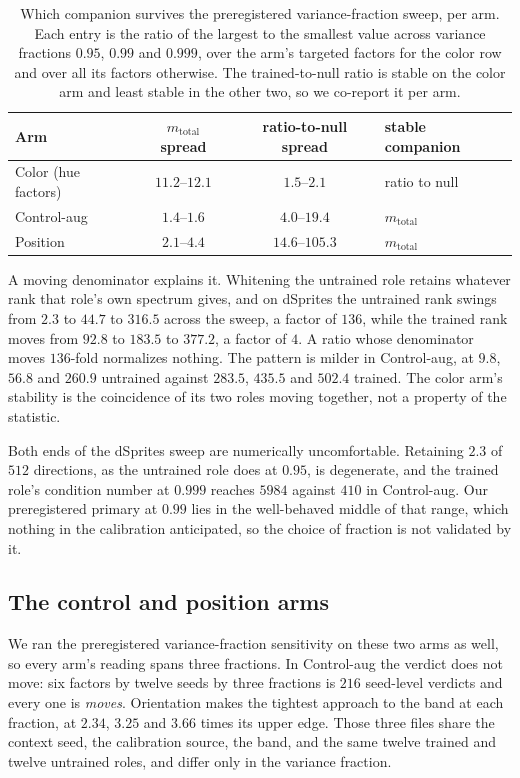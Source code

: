 \documentclass[10pt]{article}
\begin{document}
\begin{table}[tb]
\centering
\caption{Which companion survives the preregistered variance-fraction sweep, per arm. Each entry is
the ratio of the largest to the smallest value across variance fractions $0.95$, $0.99$ and $0.999$,
over the arm's targeted factors for the color row and over all its factors otherwise. The
trained-to-null ratio is stable on the color arm and least stable in the other two, so we
co-report it per arm.}
\label{tab:sweepstab}
\small
\begin{tabular}{l cc l}
\toprule
Arm & $m_{\mathrm{total}}$ spread & ratio-to-null spread & stable companion \\
\midrule
Color (hue factors) & $11.2$--$12.1$ & $1.5$--$2.1$ & ratio to null \\
Control-aug          & $1.4$--$1.6$   & $4.0$--$19.4$ & $m_{\mathrm{total}}$ \\
Position             & $2.1$--$4.4$   & $14.6$--$105.3$ & $m_{\mathrm{total}}$ \\
\bottomrule
\end{tabular}
\end{table}

A moving denominator explains it. Whitening the untrained role retains whatever rank that role's own
spectrum gives, and on dSprites the untrained rank swings
from $2.3$ to $44.7$ to $316.5$ across the sweep, a factor of $136$, while the trained rank moves
from $92.8$ to $183.5$ to $377.2$, a factor of $4$. A ratio whose denominator moves $136$-fold
normalizes nothing. The pattern is milder in Control-aug, at $9.8$, $56.8$ and $260.9$
untrained against $283.5$, $435.5$ and $502.4$ trained. The color arm's stability is the coincidence
of its two roles moving together, not a property of the statistic.

Both ends of the dSprites sweep are numerically uncomfortable. Retaining $2.3$ of
$512$ directions, as the untrained role does at $0.95$, is degenerate, and the trained role's
condition number at $0.999$ reaches $5984$ against $410$ in Control-aug. Our preregistered
primary at $0.99$ lies in the well-behaved middle of that range, which nothing in the calibration
anticipated, so the choice of fraction is not validated by it.

\subsection*{The control and position arms}
We ran the preregistered variance-fraction sensitivity on these two arms as well, so every arm's
reading spans three fractions. In Control-aug the verdict does not move:
six factors by twelve seeds by three fractions is $216$ seed-level verdicts and every one is
\emph{moves}. Orientation makes the tightest approach to the band at each fraction, at $2.34$,
$3.25$ and $3.66$ times its upper edge. Those three files share
the context seed, the calibration source, the band, and the same twelve trained and twelve untrained
roles, and differ only in the variance fraction.
\end{document}
